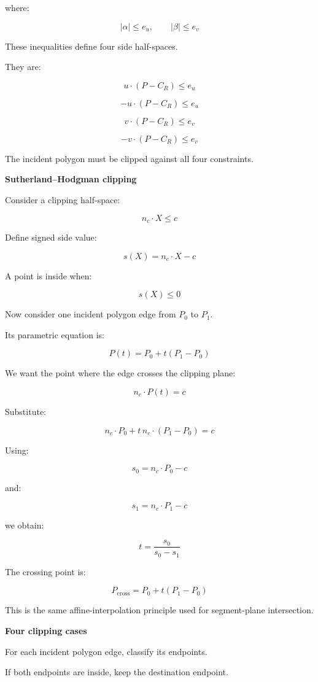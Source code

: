 where:

\[
|\alpha|\le e_u,\qquad|\beta|\le e_v
\]

These inequalities define four side half-spaces.

They are:

\[
\boxed{ u\cdot(P-C_R)\le e_u }
\]

\[
\boxed{ -u\cdot(P-C_R)\le e_u }
\]

\[
\boxed{ v\cdot(P-C_R)\le e_v }
\]

\[
\boxed{ -v\cdot(P-C_R)\le e_v }
\]

The incident polygon must be clipped against all four constraints.

\textbf{Sutherland--Hodgman clipping}

Consider a clipping half-space:

\[
\boxed{ n_c\cdot X\le c }
\]

Define signed side value:

\[
s(X)=n_c\cdot X-c
\]

A point is inside when:

\[
s(X)\le0
\]

Now consider one incident polygon edge from \(P_0\) to \(P_1\).

Its parametric equation is:

\[
P(t)=P_0+t(P_1-P_0)
\]

We want the point where the edge crosses the clipping plane:

\[
n_c\cdot P(t)=c
\]

Substitute:

\[
n_c\cdot P_0+t\,n_c\cdot(P_1-P_0)=c
\]

Using:

\[
s_0=n_c\cdot P_0-c
\]

and:

\[
s_1=n_c\cdot P_1-c
\]

we obtain:

\[
\boxed{ t=\frac{s_0}{s_0-s_1} }
\]

The crossing point is:

\[
\boxed{ P_{\mathrm{cross}}= P_0+t(P_1-P_0) }
\]

This is the same affine-interpolation principle used for segment-plane intersection.

\textbf{Four clipping cases}

For each incident polygon edge, classify its endpoints.

If both endpoints are inside, keep the destination endpoint.

